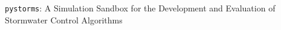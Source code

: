 \label{app:additional_act}

\texttt{pystorms}: A Simulation Sandbox for the Development and Evaluation of Stormwater Control Algorithms